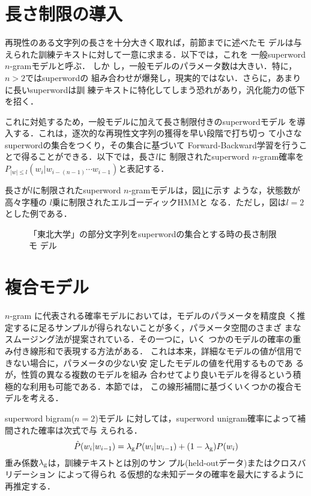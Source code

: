 \section{長さ制限の導入}
再現性のある文字列の長さを十分大きく取れば，前節までに述べたモ
デルは与えられた訓練テキストに対して一意に求まる．以下では，これを
一般superword $n$-gramモデルと呼ぶ．
しか\break
し，一般モデルのパラメータ数は大きい．特に，\(n>2\)ではsuperwordの
組み合わせが爆発し，現実的ではない．さらに，あまりに長いsuperwordは訓
練テキストに特化してしまう恐れがあり，汎化能力の低下を招く．

これに対処するため，一般モデルに加えて長さ制限付きのsuperwordモデル
を導入する．これは，逐次的な再現性文字列の獲得を早い段階で打ち切っ
て小さなsuperwordの集合をつくり，その集合に基づいて
Forward-Backward学習を行うことで得ることができる．以下では，長さ$l$に
制限されたsuperword $n$-gram確率を\(P_{|w|\leq
l}(w_i|w_{i-(n-1)}\cdots w_{i-1})\)と表記する．

長さが$l$に制限されたsuperword $n$-gramモデルは，図\ref{ergodic}に示す
ような，状態数が高々字種の\break
$l$乗に制限されたエルゴーディックHMMと
なる．ただし，図は\(l=2\)とした例である．
\begin{figure}
\begin{center}
\vspace*{-3mm}
\caption{「東北大学」の部分文字列をsuperwordの集合とする時の長さ制限モ
デル}
\label{ergodic}
\end{center}
\end{figure}
\section{複合モデル}
$n$-gram に代表される確率モデルにおいては，モデルのパラメータを精度良
く推定するに足るサンプルが得られないことが多く，パラメータ空間のさまざ
まなスムージング法が提案されている\cite{federico95}．その一つに，いく
つかのモデルの確率の重み付き線形和で表現する方法がある\cite{jelinek80}．
これは本来，詳細なモデルの値が信用できない場合に，パラメータの少ない安
定したモデルの値を代用するものであ\break
るが，性質の異なる複数のモデルを組み
合わせてより良いモデルを得るという積極的な利用も可能である．本節では，
この線形補間に基づくいくつかの複合モデルを考える．

superword bigram(\(n=2\))モデル
に対しては，superword unigram確率によって補間された確率は次式で与
えられる．
\begin{equation}
\hat{P}(w_i|w_{i-1})=\lambda_{\mbox{\scriptsize g}}
P(w_i|w_{i-1})+(1-\lambda_{\mbox{\scriptsize g}})P(w_i)
\end{equation}
重み係数\(\lambda_{\mbox{\scriptsize g}}\)は，訓練テキストとは別のサン
プル(held-outデータ)またはクロスバリデーション\break
によって得られ
る仮想的な未知データの確率を最大にするように再推定する．

